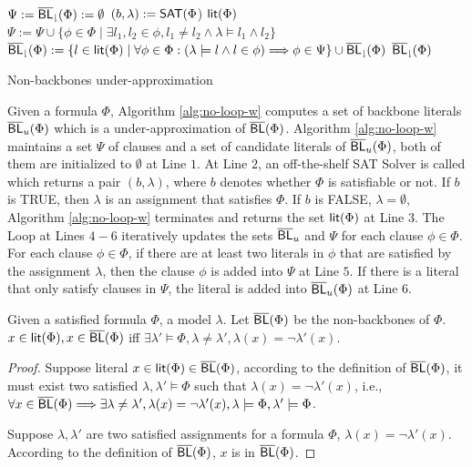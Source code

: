 \begin{algorithm}
\SetAlgoShortEnd
\SetFillComment
{}

$\Psi:={\sf \overline{BL}_\downharpoonright}(\Phi):=\emptyset$\;
$(b,\lambda):=\textsf{SAT}(\Phi$)\;
 \Return $\textsf{lit}(\Phi)$\;
$\Psi := \Psi\cup\{\phi\in\Phi \mid \exists l_1, l_2\in \phi, l_1\neq l_2 \wedge\lambda\models l_1\wedge l_2\}$\; 
${\sf \overline{BL}_\downharpoonright}(\Phi):=\{l\in\textsf{lit}(\Phi) \mid  \forall\phi\in\Phi: (\lambda\models l\wedge l\in\phi)\Longrightarrow\phi\in\Psi\}\cup {\sf \overline{BL}_\downharpoonright}(\Phi)$\;
\Return ${\sf \overline{BL}_\downharpoonright}(\Phi)$\;
\caption{Non-backbones under-approximation}
\label{alg:no-loop-w}
\end{algorithm}

Given a formula $\Phi$, Algorithm \ref{alg:no-loop-w} computes a set of backbone literals $\overline{\textsf{BL}}_u(\Phi)$ which is a under-approximation of $\overline{\textsf{BL}}(\Phi)$.
Algorithm \ref{alg:no-loop-w} maintains a set $\Psi$ of clauses and a set of candidate literals of $\overline{\textsf{BL}}_u(\Phi)$, both of them are initialized to $\emptyset$ at Line $1$.
At Line $2$, an off-the-shelf SAT Solver is called which returns a pair $(b,\lambda)$, where $b$ denotes whether $\Phi$ is satisfiable or not. If $b$ is TRUE, then $\lambda$ is an assignment that satisfies
$\Phi$. If $b$ is FALSE, $\lambda=\emptyset$, Algorithm \ref{alg:no-loop-w} terminates and returns the set $\textsf{lit}(\Phi)$ at Line $3$.
The Loop at Lines $4-6$ iteratively updates the sets $\overline{\textsf{BL}}_u$ and $\Psi$ for each clause $\phi\in\Phi$. For each clause $\phi\in\Phi$, if there are at least two literals in $\phi$
that are satisfied by the assignment $\lambda$, then the clause $\phi$ is added into $\Psi$ at Line $5$. If there is a literal that only satisfy clauses in $\Psi$, the literal is added into $\overline{\textsf{BL}}_u(\Phi)$ at Line $6$.

\begin{lemma}
Given a satisfied formula $\Phi$, a model $\lambda$. Let $\overline{\textsf{BL}}(\Phi)$ be the non-backbones of $\Phi$.
$x\in\textsf{lit}(\Phi), x\in\overline{\textsf{BL}}(\Phi)$ iff $\exists\lambda'\models\Phi, \lambda\neq\lambda',
\lambda(x)=\neg\lambda'(x)$.
\end{lemma}\label{lem:nBL}
\begin{proof}
Suppose literal $x\in\textsf{lit}(\Phi)\in\overline{\textsf{BL}}(\Phi)$, according to the definition of $\overline{\textsf{BL}}(\Phi)$,
it must exist two satisfied $\lambda, \lambda'\models\Phi$
such that $\lambda(x)=\neg\lambda'(x)$, i.e.,
$\forall x\in\overline{\textsf{BL}}(\Phi)\Longrightarrow\exists \lambda\neq\lambda', \lambda(x)=\neg\lambda'(x), \lambda\models\Phi,\lambda'\models\Phi$.

Suppose $\lambda, \lambda'$ are two satisfied assignments for a formula $\Phi$,
$\lambda(x)=\neg\lambda'(x)$.
According to the definition of $\overline{\textsf{BL}}(\Phi)$, $x$ is in $\overline{\textsf{BL}}(\Phi)$.
\end{proof}

